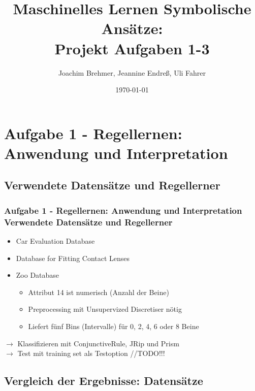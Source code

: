 \documentclass[accentcolor=tud6b,colorbacktitle,inverttitle,landscape,german,presentation,t]{tudbeamer}
\begin{document}
\title[MLDM: Projekt Aufgabe 1-3]{Maschinelles Lernen Symbolische Ansätze:\\ Projekt Aufgaben 1-3}
\subtitle{}

\author[brehmer\_endreß\_fahrer]{Joachim Brehmer, Jeannine Endreß, Uli Fahrer}

\date{\today}

\begin{titleframe}
\tableofcontents
\end{titleframe}

    \section{Aufgabe 1 - Regellernen: Anwendung und Interpretation}
    
    \subsection{Verwendete Datensätze und Regellerner}
    
    \begin{frame}[t]
    \frametitle{Aufgabe 1 - Regellernen: Anwendung und Interpretation\\ Verwendete Datensätze und Regellerner}
        \begin{itemize}
            \item Car Evaluation Database
            \item Database for Fitting Contact Lenses
            \item Zoo Database
            \begin{itemize}
                \item Attribut 14 ist numerisch (Anzahl der Beine)
                \item Preprocessing mit Unsupervized Discretiser nötig
                \item Liefert fünf Bins (Intervalle) für 0, 2, 4, 6 oder 8 Beine
            \end{itemize}
        \end{itemize}
        \vfill
        $\rightarrow$ Klassifizieren mit ConjunctiveRule, JRip und Prism\\
        $\rightarrow$ Test mit training set als Testoption //TODO!!!
    \end{frame}
    
    \subsection{Vergleich der Ergebnisse: Datensätze}
    
\end{document}
